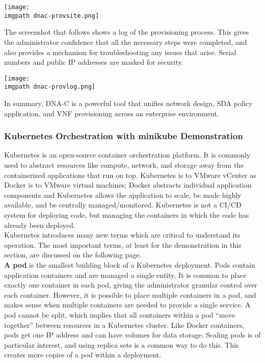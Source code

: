     \begin{minipage}[t]{\linewidth}
	  \centering
      \texttt{[image: \\imgpath dnac-provsite.png]}
    \end{minipage}

The screenshot that follows shows a log of the provisioning process. This
gives the administrator confidence that all the necessary steps were
completed, and also provides a mechanism for troubleshooting any issues that
arise. Serial numbers and public IP addresses are masked for security.

    \begin{minipage}[t]{\linewidth}
	  \centering
      \texttt{[image: \\imgpath dnac-provlog.png]}
    \end{minipage}

In summary, DNA-C is a powerful tool that unifies network design, SDA policy
application, and VNF provisioning across an enterprise environment.

\subsubsection{Kubernetes Orchestration with minikube Demonstration}
Kubernetes is an open-source container orchestration platform. It is commonly
used to abstract resources like compute, network, and storage away from the
containerized applications that run on top. Kubernetes is to VMware vCenter as
Docker is to VMware virtual machines; Docker abstracts individual application
components and Kubernetes allows the application to scale, be made highly
available, and be centrally managed/monitored. Kubernetes is not a CI/CD
system for deploying code, but managing the containers in which the code has
already been deployed. \\

Kubernetes introduces many new terms which are critical to understand its
operation. The most important terms, at least for the demonstration in this
section, are discussed on the following page. \\

\textbf{A pod} is the smallest building block of a Kubernetes deployment. Pods
contain application containers and are managed a single entity. It is common
to place exactly one container in each pod, giving the administrator granular
control over each container. However, it is possible to place multiple
containers in a pod, and makes sense when multiple containers are needed to
provide a single service. A pod cannot be split, which implies that all
containers within a pod ``move together'' between resources in a Kubernetes
cluster. Like Docker containers, pods get one IP address and can have volumes
for data storage. Scaling pods is of particular interest, and using replica
sets is a common way to do this. This creates more copies of a pod within a
deployment. \\


